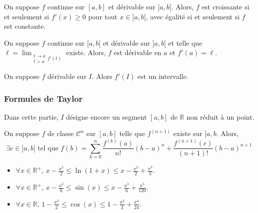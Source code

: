 	\begin{corollary}
		On suppose $f$ continue sur $[a,b]$ et dérivable sur $]a,b[$. Alors, $f$ est croissante si et seulement si $f'(x) \geq 0$ pour tout $x \in ]a,b[$, avec égalité si et seulement si $f$ est constante.
	\end{corollary}
	
	\begin{corollary}
		On suppose $f$ continue sur $[a,b[$ et dérivable sur $]a,b[$ et telle que $\ell = \lim_{\substack{t \rightarrow a \\ t > a} f'(t)}$ existe. Alors, $f$ est dérivable en $a$ et $f'(a) = \ell$.
	\end{corollary}
	
	
	\begin{theorem}[Darboux]
		On suppose $f$ dérivable sur $I$. Alors $f'(I)$ est un intervalle.
	\end{theorem}
	
	\subsubsection{Formules de Taylor}
	
	
	Dans cette partie, $I$ désigne encore un segment $[a,b]$ de $\mathbb{R}$ non réduit à un point.
	
	\begin{theorem}
		On suppose $f$ de classe $\mathcal{C}^n$ sur $[a,b]$ telle que $f^{(n+1)}$ existe sur $]a,b$. Alors,
		\[ \exists c \in ]a,b[ \text{ tel que } f(b) =  \sum_{k=0}^{n} \frac{f^{(k)} (a)}{n!} (b-a)^n + \frac{f^{(n+1)}(c)}{(n+1)!} (b-a)^{n+1} \]
	\end{theorem}
	
	\begin{application}
		\begin{itemize}
			\item $\forall x \in \mathbb{R}^+, \, x - \frac{x^2}{2} \leq \ln(1+x) \leq x - \frac{x^2}{2} + \frac{x^3}{3}$.
			\item $\forall x \in \mathbb{R}^+, \, x - \frac{x^3}{6} \leq \sin(x) \leq x - \frac{x^3}{6} + \frac{x^5}{120}$.
			\item $\forall x \in \mathbb{R}, \, 1 - \frac{x^2}{2} \leq \cos(x) \leq 1 - \frac{x^2}{2} + \frac{x^4}{24}$.
		\end{itemize}
	\end{application}
	
